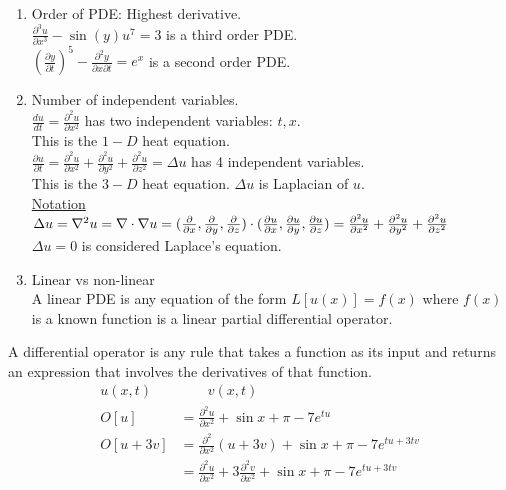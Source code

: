 \begin{enumerate}
  \item Order of PDE: Highest derivative.\\
  \Ex $\frac{\partial^3 u}{\partial x^3} - \sin(y) u^7 = 3$ is a third order PDE.\\
  \Ex $(\frac{\partial y}{\partial t})^5 - \frac{\partial^2y}{\partial x \partial t} = e^x$ is a second order PDE.
  \item Number of independent variables.\\
  \Ex $\frac{du}{dt} = \frac{\partial^2 u}{\partial x^2}$ has two independent variables: $t, x$.\\
  This is the $1-D$ heat equation.\\
  \Ex $\frac{\partial u}{\partial t} = \frac{\partial^2 u}{\partial x^2} + \frac{\partial^2 u}{\partial y^2} + \frac{\partial^2 u}{\partial z^2} = \Delta u$ has 4 independent variables.\\
  This is the $3-D$ heat equation. $\Delta u$ is Laplacian of $u$.\\
  \underline{Notation}\\
  $
  \Delta u =
  \nabla^2 u =
  \nabla \cdot \nabla u =
  (\frac{\partial}{\partial x}, \frac{\partial}{\partial y}, \frac{\partial}{\partial z}) \cdot (\frac{\partial u}{\partial x}, \frac{\partial u}{\partial y}, \frac{\partial u}{\partial z}) =
  \frac{\partial^2 u}{\partial x^2} + \frac{\partial^2 u}{\partial y^2} + \frac{\partial^2 u}{\partial z^2}
  $\\
  $\Delta u = 0$ is considered Laplace's equation.
  \item Linear vs non-linear\\
  A linear PDE is any equation of the form $L[u(x)] = f(x)$ where $f(x)$ is a known function is a linear partial differential operator.
\end{enumerate}
\dfn A differential operator is any rule that takes a function as its input and returns an expression that involves the derivatives of that function.\\
\Ex
\begin{align}
  u(x, t) & \qquad v(x, t)\\
  O[u] & = \frac{\partial^2 u}{\partial x^2} + \sin x + \pi - 7e^{tu}\\
  O[u + 3v] & = \frac{\partial^2}{\partial x^2}(u + 3v) + \sin x + \pi - 7e^{tu + 3tv}\\
  & = \frac{\partial^2 u}{\partial x^2} + 3 \frac{\partial^2 v}{\partial x^2}+ \sin x + \pi - 7e^{tu + 3tv}
\end{align}
